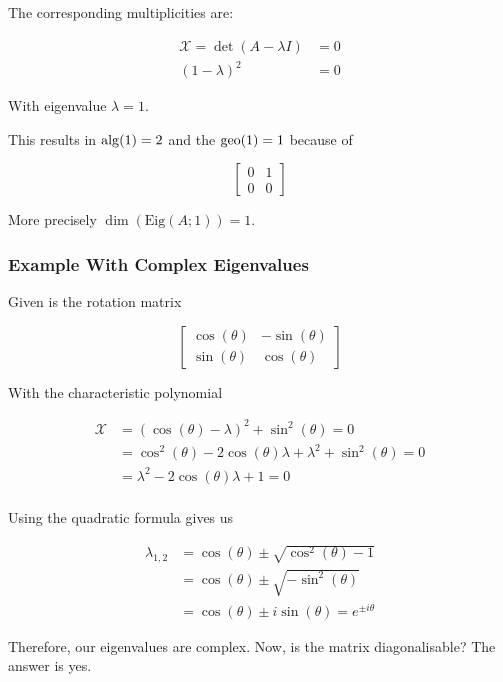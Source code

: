 The corresponding multiplicities are:

\begin{align*}
    \mathcal{X} =\det (A - \lambda I) &= 0 \\
    (1 - \lambda)^2 &= 0
\end{align*}

With eigenvalue \(\lambda = 1\).

This results in \(\mathrm{alg}(1)= 2\) and the \(\mathrm{geo}(1) = 1\) because of 

\[
    \begin{bmatrix}
        0 & 1 \\
        0 & 0
    \end{bmatrix}
\]

More precisely \(\dim(\mathrm{Eig}(A;1)) = 1\).

\subsubsection{Example With Complex Eigenvalues}

Given is the rotation matrix

\[
    \begin{bmatrix}
        \cos(\theta) & -\sin(\theta) \\
        \sin(\theta) & \cos(\theta)
    \end{bmatrix}
\]

With the characteristic polynomial 

\begin{align*}
    \mathcal{X} &= (\cos(\theta)- \lambda)^2 + \sin^2(\theta) = 0\\
    &= \cos^2(\theta) - 2\cos(\theta)\lambda + \lambda^2 + \sin^2(\theta) = 0 \\
    &= \lambda^2 -2\cos(\theta)\lambda + 1 = 0 \\
\end{align*}

Using the quadratic formula gives us 

\begin{align*}
    \lambda_{1,2} &= \cos(\theta) \pm \sqrt{\cos^2(\theta) - 1} \\ 
    &= \cos(\theta) \pm \sqrt{-\sin^2(\theta)} \\
    &= \cos(\theta) \pm i\sin(\theta) = e^{\pm i\theta}
\end{align*}

Therefore, our eigenvalues are complex. Now, is the matrix diagonalisable? The answer is yes. 

